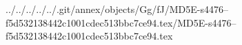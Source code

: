 ../../../../../.git/annex/objects/Gg/fJ/MD5E-s4476--f5d532138442c1001cdec513bbc7ce94.tex/MD5E-s4476--f5d532138442c1001cdec513bbc7ce94.tex